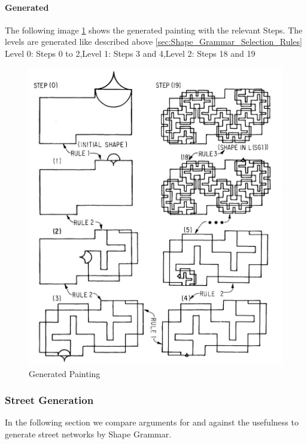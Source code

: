 \documentclass[11pt, a4paper]{report}
\begin{document}
\paragraph{Generated}
The following image \ref{fig:Shape Grammars/Example} shows the generated painting with the relevant Steps. The levels are generated like described above \ref{sec:Shape_Grammar_Selection_Rules} 
\newline
Level 0: Steps 0 to 2,\newline Level 1: Steps 3 and 4,\newline Level 2: Steps 18 and 19
\begin{figure}[!h]
    \centering
    \includegraphics{sg_example.jpg}
    \caption{ Generated Painting\citep{shapeGrammars:1972}}\label{fig:Shape Grammars/Example}
\end{figure}

\pagebreak
\subsubsection{Street Generation}
In the following section we compare arguments for and against the usefulness to generate street networks by Shape Grammar. 
\end{document}
